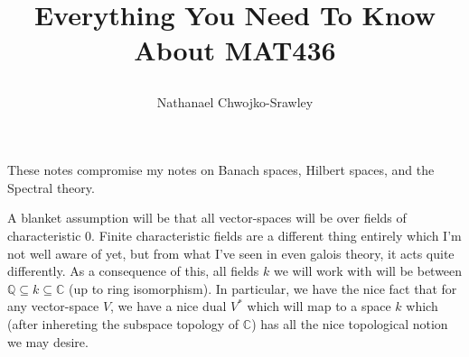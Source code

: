 \documentclass[oneside]{book}
\title{
	\begin{huge}
		\bf{Everything You Need To Know About MAT436}
	\end{huge}
	}
\author{Nathanael Chwojko-Srawley}
\newcommand{\Q}{\mathbb{Q}}
\newcommand{\C}{\mathbb{C}}
\newcommand{\sse}{\subseteq}
\newenvironment{titledBox}[1]
 {\begin{tcolorbox}[enhanced, sharp corners, colback=white , borderline={0.2pt}{0pt}{black}]
   \begin{quote}\textbf{#1}
   }{
   \end{quote}\end{tcolorbox}}
\begin{document}
\maketitle
\tableofcontents


These notes compromise my notes on Banach spaces, Hilbert spaces, and the Spectral theory.

A blanket assumption will be that all vector-spaces will be over fields of characteristic $0$. Finite characteristic
fields are a different thing entirely which I'm not well aware of yet, but from what I've seen in even galois theory, it
acts quite differently. As a consequence of this, all fields $k$ we will work with will be between $\Q \sse k \sse \C$
(up to ring isomorphism). In particular, we have the nice fact that for any vector-space $V$, we have a nice
dual $V^*$ which will map to a space $k$ which (after inhereting the subspace topology of $\C$) has all the nice
topological notion we may desire.
\end{document}
